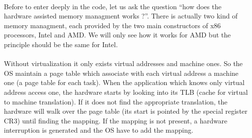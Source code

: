 \label{memory/hap}

\paragraph{}
Before to enter deeply in the code, let us ask the question ``how does the
hardware assisted memory managment works ?''.
There is actually two kind of memory managment, each provided by the two main
constructors of x86 processors, Intel and AMD.
We will only see how it works for AMD but the principle should be the same for
Intel.

\paragraph{}
Without virtualization it only exists virtual addresses and machine ones.
So the OS maintain a page table which associate with each virtual address a
machine one (a page table for each task).
When the application which knows only virtual address access one, the hardware
starts by looking into its TLB (cache for virtual to machine translation).
If it does not find the appropriate translation, the hardware will walk over
the page table (its start is pointed by the special register CR3) until finding
the mapping.
If the mapping is not present, a hardware interruption is generated and the OS
have to add the mapping.

